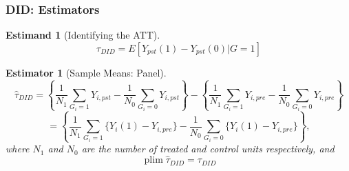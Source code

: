 \documentclass[xcolor=svgnames,9pt,english, aspectratio=169]{beamer}
\newtheorem{estm}{Estimand}
\newtheorem{esti}{Estimator}
\begin{document}
\begin{frame}
  \frametitle{DID: Estimators}
\begin{estm}[Identifying the ATT]\small
$$\tau_{DID} = E[Y_{pst}(1)-Y_{pst}(0)|G=1]$$\pause
\end{estm}\vspace{-.05in}
\begin{esti}[Sample Means: Panel]\small
\[
  \hat\tau_{DID} = \left\{\frac{1}{N_1}\sum_{G_i=1} Y_{i,pst} -
\frac{1}{N_0}\sum_{G_i=0} Y_{i,pst}\right\} -
\left\{\frac{1}{N_1}\sum_{G_i=1} Y_{i,pre} -
\frac{1}{N_0}\sum_{G_i=0} Y_{i,pre}\right\}
\]
\[
=\left\{\frac{1}{N_1}\sum_{G_i=1} \{Y_i(1)-Y_{i,pre}\} -
\frac{1}{N_0}\sum_{G_i=0} \{Y_i(1)-Y_{i,pre}\}\right\},
\]
where $N_1$ and $N_0$ are the number of treated and control units respectively, and
$$\operatorname{plim} \hat\tau_{DID} = \tau_{DID}$$
\end{esti}
\end{frame}
\end{document}
